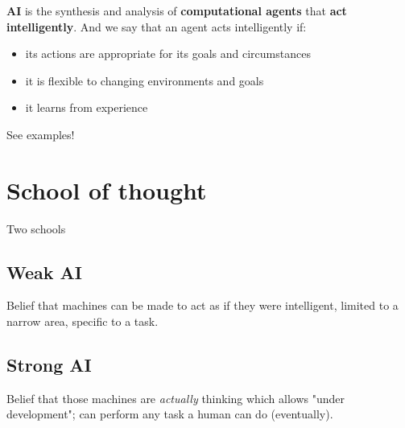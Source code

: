 \documentclass{article}
\begin{document}
\textbf{AI} is the synthesis and analysis of \textbf{computational agents} that \textbf{act intelligently}. And we say that an agent acts intelligently if:
\begin{itemize}
				\item its actions are appropriate for its goals and circumstances
				\item it is flexible to changing environments and goals
				\item it learns from experience
\end{itemize}

See examples!

\section{School of thought}
Two schools
\subsection{Weak AI}
Belief that machines can be made to act as if they were intelligent, limited to a narrow area, specific to a task.
\subsection{Strong AI}
Belief that those machines are \emph{actually} thinking which allows "under development"; can perform any task a human can do (eventually).
\end{document}
